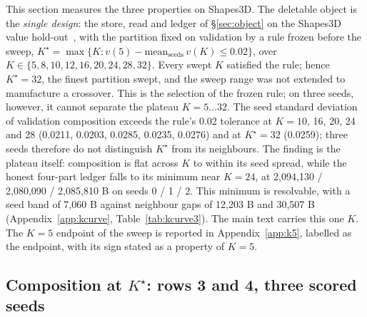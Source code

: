 \documentclass{article} %
\newcommand{\Kstar}{\ensuremath{K^{\star}}}
\begin{document}
This section measures the three properties on Shapes3D. The deletable object is the \emph{single design}: the store, read and ledger of
\S\ref{sec:object} on the Shapes3D value hold-out~\citep{montero2021role,schott2021visual}, with the partition fixed on validation
by a rule frozen before the sweep, $\Kstar=\max\{K : v(5)-\text{mean}_{\text{seeds}}\,v(K)\le
0.02\}$, over $K\in\{5,8,10,12,16,20,24,28,32\}$. Every swept $K$ satisfied the rule; hence
$\Kstar=32$, the finest partition swept, and the sweep range was not extended to manufacture a
crossover. %
This is the selection of the frozen rule; on three seeds, however, it cannot separate the plateau
$K=5\ldots32$. The seed standard deviation of validation composition exceeds the rule's 0.02
tolerance at $K=10$, 16, 20, 24 and 28 (0.0211, 0.0203, 0.0285, 0.0235, 0.0276) and at $\Kstar=32$ %
(0.0259); three seeds therefore do not distinguish $\Kstar$ from its neighbours. %
The finding is the plateau itself: composition is flat across $K$ to within its seed spread,
while the honest four-part ledger falls to its minimum near $K=24$, at 2,094,130 / 2,080,090 / 2,085,810 B %
on seeds 0 / 1 / 2. This minimum is resolvable, with a seed band of 7,060 B against neighbour gaps of %
12,203 B and 30,507 B (Appendix~\ref{app:kcurve}, Table~\ref{tab:kcurve3}). %
The main text carries this one $K$. The $K=5$ endpoint of the sweep is reported in
Appendix~\ref{app:k5}, labelled as the endpoint, with its sign stated as a property of $K=5$.

\subsection{Composition at $\Kstar$: rows 3 and 4, three scored seeds}
\label{sec:shapes-t7}
\end{document}
